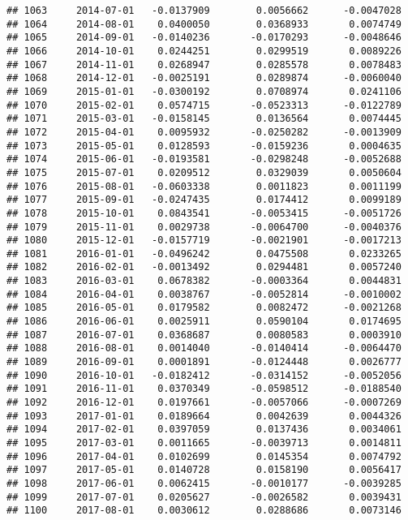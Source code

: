 \documentclass[
]{article}
\begin{document}
\begin{verbatim}
## 1063     2014-07-01   -0.0137909        0.0056662      -0.0047028
## 1064     2014-08-01    0.0400050        0.0368933       0.0074749
## 1065     2014-09-01   -0.0140236       -0.0170293      -0.0048646
## 1066     2014-10-01    0.0244251        0.0299519       0.0089226
## 1067     2014-11-01    0.0268947        0.0285578       0.0078483
## 1068     2014-12-01   -0.0025191        0.0289874      -0.0060040
## 1069     2015-01-01   -0.0300192        0.0708974       0.0241106
## 1070     2015-02-01    0.0574715       -0.0523313      -0.0122789
## 1071     2015-03-01   -0.0158145        0.0136564       0.0074445
## 1072     2015-04-01    0.0095932       -0.0250282      -0.0013909
## 1073     2015-05-01    0.0128593       -0.0159236       0.0004635
## 1074     2015-06-01   -0.0193581       -0.0298248      -0.0052688
## 1075     2015-07-01    0.0209512        0.0329039       0.0050604
## 1076     2015-08-01   -0.0603338        0.0011823       0.0011199
## 1077     2015-09-01   -0.0247435        0.0174412       0.0099189
## 1078     2015-10-01    0.0843541       -0.0053415      -0.0051726
## 1079     2015-11-01    0.0029738       -0.0064700      -0.0040376
## 1080     2015-12-01   -0.0157719       -0.0021901      -0.0017213
## 1081     2016-01-01   -0.0496242        0.0475508       0.0233265
## 1082     2016-02-01   -0.0013492        0.0294481       0.0057240
## 1083     2016-03-01    0.0678382       -0.0003364       0.0044831
## 1084     2016-04-01    0.0038767       -0.0052814      -0.0010002
## 1085     2016-05-01    0.0179582        0.0082472      -0.0021268
## 1086     2016-06-01    0.0025911        0.0590104       0.0174695
## 1087     2016-07-01    0.0368687        0.0080583       0.0003910
## 1088     2016-08-01    0.0014040       -0.0140414      -0.0064470
## 1089     2016-09-01    0.0001891       -0.0124448       0.0026777
## 1090     2016-10-01   -0.0182412       -0.0314152      -0.0052056
## 1091     2016-11-01    0.0370349       -0.0598512      -0.0188540
## 1092     2016-12-01    0.0197661       -0.0057066      -0.0007269
## 1093     2017-01-01    0.0189664        0.0042639       0.0044326
## 1094     2017-02-01    0.0397059        0.0137436       0.0034061
## 1095     2017-03-01    0.0011665       -0.0039713       0.0014811
## 1096     2017-04-01    0.0102699        0.0145354       0.0074792
## 1097     2017-05-01    0.0140728        0.0158190       0.0056417
## 1098     2017-06-01    0.0062415       -0.0010177      -0.0039285
## 1099     2017-07-01    0.0205627       -0.0026582       0.0039431
## 1100     2017-08-01    0.0030612        0.0288686       0.0073146

\end{verbatim}
\end{document}
